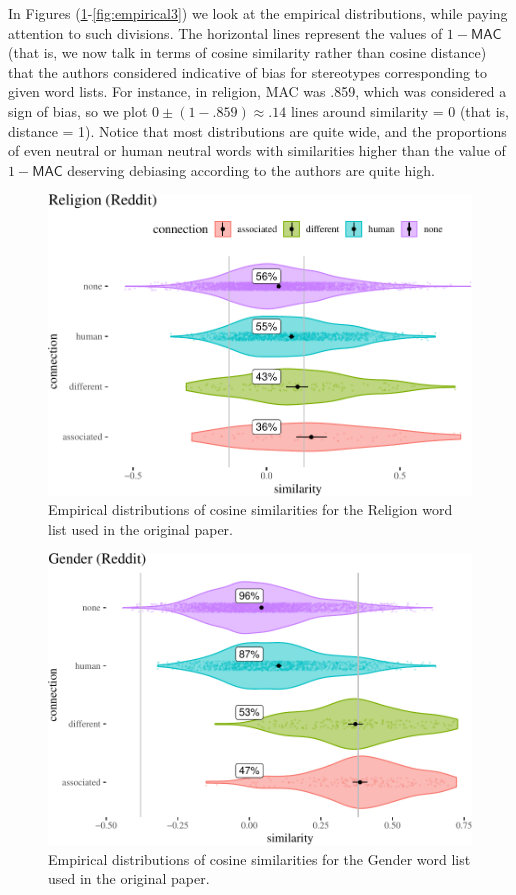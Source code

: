 \documentclass{clv3}
\begin{document}
In Figures (\ref{fig:empirical0}-\ref{fig:empirical3}) we look at the
empirical distributions, while paying attention to such divisions. The
horizontal lines represent the values of \(1 - \mathsf{MAC}\) (that is,
we now talk in terms of cosine similarity rather than cosine distance)
that the authors considered indicative of bias for stereotypes
corresponding to given word lists. For instance, in religion,
\textsf{MAC} was .859, which was considered a sign of bias, so we plot
\(0\pm (1-.859)\approx .14\) lines around similarity = 0 (that is,
distance = 1). Notice that most distributions are quite wide, and the
proportions of even neutral or human neutral words with similarities
higher than the value of \(1 - \mathsf{MAC}\) deserving debiasing
according to the authors are quite high.

\begin{figure}

\begin{center}\includegraphics[width=0.7\linewidth]{figures/figcosineDistributions8d} \end{center}

\caption{Empirical distributions of cosine similarities  for the Religion word list  used in  the original paper. }

\label{fig:empirical0}
\end{figure}

\begin{figure}

\begin{center}\includegraphics[width=0.7\linewidth]{figures/figcosineDistributions8df} \end{center}

\caption{Empirical distributions of cosine similarities for the Gender word list used in  the original paper.  }

\label{fig:empirical2}
\end{figure}
\end{document}
